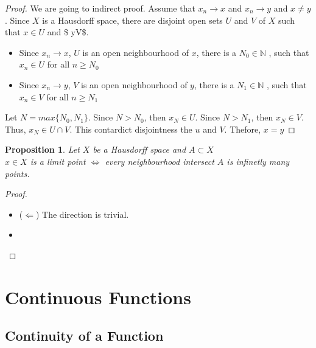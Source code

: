 \documentclass[
]{book}
\providecommand{\tightlist}{%
  \setlength{\itemsep}{0pt}\setlength{\parskip}{0pt}}
\newtheorem{proposition}{Proposition}[chapter]
\theoremstyle{definition}
\theoremstyle{definition}
\theoremstyle{definition}
\theoremstyle{definition}
\theoremstyle{remark}
\begin{document}
\begin{proof}
We are going to indirect proof. Assume that \(x_n \to x\) and \(x_n \to y\) and \(x\neq y\). Since \(X\) is a Hausdorff space, there are disjoint open sets \(U\) and \(V\) of \(X\) such that \(x\in U\) and \$ y\in V\$.

\begin{itemize}
\tightlist
\item
  Since \(x_n \to x\), \(U\) is an open neighbourhood of \(x\), there is a \(N_0\in \mathbb{N}\) , such that \(x_n \in U\) for all \(n\geq N_0\)
\item
  Since \(x_n \to y\), \(V\) is an open neighbourhood of \(y\), there is a \(N_1\in \mathbb{N}\) , such that \(x_n \in V\) for all \(n\geq N_1\)
\end{itemize}

Let \(N=max\{N_0,N_1\}\).
Since \(N>N_0\), then \(x_N\in U\).
Since \(N>N_1\), then \(x_N\in V\).
Thus, \(x_N\in U \cap V\). This contardict disjointness the \(u\) and \(V\). Thefore, \(x=y\)
\end{proof}

\begin{proposition}
\protect\hypertarget{prp:unnamed-chunk-85}{}\label{prp:unnamed-chunk-85}Let \(X\) be a Hausdorff space and \(A\subset X\)\\
\(x\in X\) is a limit point \(\iff\) every neighbourhood intersect \(A\) is infinetly many points.
\end{proposition}

\begin{proof}
\leavevmode

\begin{itemize}
\tightlist
\item
  (\(\Longleftarrow\)) The direction is trivial.
\item
\end{itemize}

\end{proof}

\hypertarget{continuous-functions}{%
\section{Continuous Functions}\label{continuous-functions}}

\hypertarget{continuity-of-a-function}{%
\subsection{Continuity of a Function}\label{continuity-of-a-function}}
\end{document}
